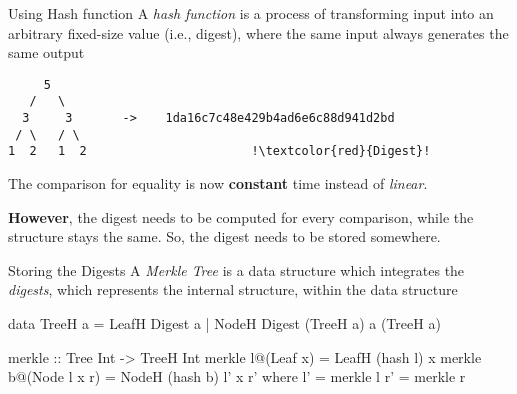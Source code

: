 \begin{slide}{Using Hash function}
A \textit{hash function} is a process of transforming input into an arbitrary fixed-size value (i.e., digest), where the same input always generates the same output

\begin{center}
\begin{verbatim}
     5 
   /   \
  3     3       ->    1da16c7c48e429b4ad6e6c88d941d2bd
 / \   / \    
1  2   1  2                       !\textcolor{red}{Digest}!  
\end{verbatim}
\end{center}

\vspace*{0.4cm}
The comparison for equality is now \textbf{constant} time instead of \textit{linear}.

\textbf{However}, the digest needs to be computed for every comparison, while the structure stays the same. So, the digest needs to be stored somewhere. 
\end{slide}



\begin{slide}{Storing the Digests}
A \textit{Merkle Tree} is a data structure which integrates the \textit{digests}, which represents the internal structure, within the data structure

\vspace*{0.4cm}
\begin{haskell}
data TreeH a = LeafH Digest a
             | NodeH Digest (TreeH a) a (TreeH a)


merkle :: Tree Int -> TreeH Int
merkle l@(Leaf x)     = LeafH (hash l) x
merkle b@(Node l x r) = NodeH (hash b) l' x r'
  where
    l' = merkle l
    r' = merkle r
\end{haskell}
\end{slide}

